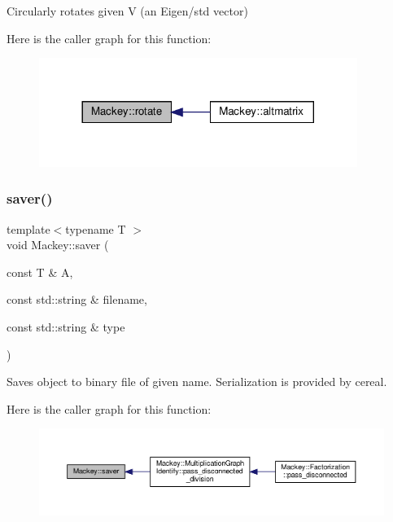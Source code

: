 Circularly rotates given V (an Eigen/std vector) 

Here is the caller graph for this function\+:\nopagebreak
\begin{figure}[H]
\begin{center}
\leavevmode
\includegraphics[width=293pt]{namespaceMackey_a38a833de54971845cbdb8c96f830725b_icgraph}
\end{center}
\end{figure}
\mbox{\label{namespaceMackey_a1824d780ce15f1845e4f87bf056feec9}} 
\subsubsection{\texorpdfstring{saver()}{saver()}}
{\footnotesize\ttfamily template$<$typename T $>$ \\
void Mackey\+::saver (\begin{DoxyParamCaption}\item[{const T \&}]{A,  }\item[{const std\+::string \&}]{filename,  }\item[{const std\+::string \&}]{type }\end{DoxyParamCaption})}



Saves object to binary file of given name. Serialization is provided by cereal. 

Here is the caller graph for this function\+:\nopagebreak
\begin{figure}[H]
\begin{center}
\leavevmode
\includegraphics[width=350pt]{namespaceMackey_a1824d780ce15f1845e4f87bf056feec9_icgraph}
\end{center}
\end{figure}
\mbox{\label{namespaceMackey_a43cf712cb611ddbafa91b005a911436e}} 
